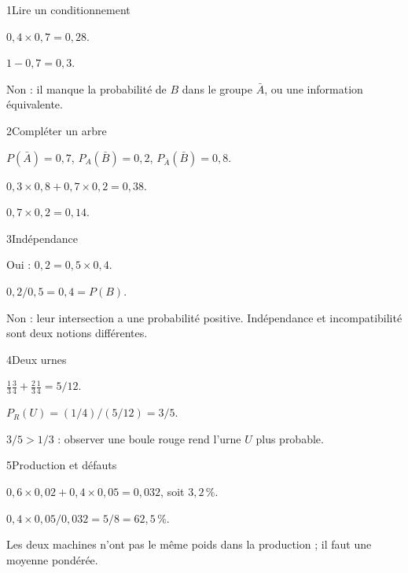 \begin{corrige}{1}{Lire un conditionnement}
\begin{questions}
\item $0{,}4\times0{,}7=0{,}28$.
\item $1-0{,}7=0{,}3$.
\item Non : il manque la probabilité de $B$ dans le groupe $\bar A$, ou une information équivalente.
\end{questions}
\end{corrige}
\begin{corrige}{2}{Compléter un arbre}
\begin{questions}
\item $P(\bar A)=0{,}7$, $P_A(\bar B)=0{,}2$, $P_{\bar A}(\bar B)=0{,}8$.
\item $0{,}3\times0{,}8+0{,}7\times0{,}2=0{,}38$.
\item $0{,}7\times0{,}2=0{,}14$.
\end{questions}
\end{corrige}
\begin{corrige}{3}{Indépendance}
\begin{questions}
\item Oui : $0{,}2=0{,}5\times0{,}4$.
\item $0{,}2/0{,}5=0{,}4=P(B)$.
\item Non : leur intersection a une probabilité positive. Indépendance et incompatibilité sont deux notions différentes.
\end{questions}
\end{corrige}
\begin{corrige}{4}{Deux urnes}
\begin{questions}
\item $\frac13\frac34+\frac23\frac14=5/12$.
\item $P_R(U)=(1/4)/(5/12)=3/5$.
\item $3/5>1/3$ : observer une boule rouge rend l’urne $U$ plus probable.
\end{questions}
\end{corrige}
\begin{corrige}{5}{Production et défauts}
\begin{questions}
\item $0{,}6\times0{,}02+0{,}4\times0{,}05=0{,}032$, soit $3{,}2\,\%$.
\item $0{,}4\times0{,}05/0{,}032=5/8=62{,}5\,\%$.
\item Les deux machines n’ont pas le même poids dans la production ; il faut une moyenne pondérée.
\end{questions}
\end{corrige}
